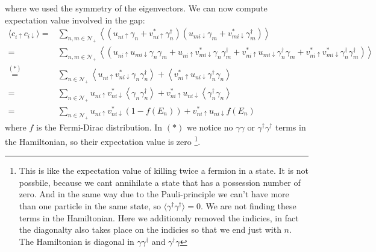 \documentclass[../main.tex]{subfile}
\begin{document}
where we used the symmetry of the eigenvectors. We can now compute expectation value involved in the gap:
\begin{equation}\label{eq:transfo_c_up_c_down_BdG}
\begin{aligned}
    \langle c_{i\uparrow}c_{i\downarrow} \rangle =& \sum_{n,m\in\mathcal{N}_+} \left\langle\left(u_{ni\uparrow}\gamma_n + v_{ni\uparrow}^{\ast}\gamma_{n}^{\dagger}\right)\left(u_{mi\downarrow}\gamma_m + v_{mi\downarrow}^{\ast}\gamma_{m}^{\dagger}\right)\right\rangle\\
     =&  \sum_{n,m\in\mathcal{N}_+} \left\langle\left(u_{ni\uparrow} u_{mi\downarrow}\gamma_n\gamma_m + u_{ni\uparrow} v_{mi\downarrow}^{\ast}\gamma_n\gamma_{m}^{\dagger} + v_{ni\uparrow}^{\ast}u_{mi\downarrow}\gamma_{n}^{\dagger} \gamma_m+  v_{ni\uparrow}^{\ast} v_{mi\downarrow}^{\ast}\gamma_{n}^{\dagger}\gamma_{m}^{\dagger}  \right)\right\rangle\\
     \stackrel{(\ast)}{=}&  \sum_{n\in\mathcal{N}_+} \left\langle u_{ni\uparrow} v_{ni\downarrow}^{\ast}\gamma_n\gamma_{n}^{\dagger}\right\rangle + \left\langle v_{ni\uparrow}^{\ast}u_{ni\downarrow}\gamma_{n}^{\dagger}\gamma_{n}\right\rangle\\     
     =&  \sum_{n\in\mathcal{N}_+} u_{ni\uparrow} v_{ni\downarrow}^{\ast}\left\langle\gamma_n\gamma_{n}^{\dagger}\right\rangle + v_{ni\uparrow}^{\ast}u_{ni\downarrow}\left\langle \gamma_{n}^{\dagger}\gamma_{n}\right\rangle\\
     =&  \sum_{n\in\mathcal{N}_+} u_{ni\uparrow} v_{ni\downarrow}^{\ast} \left(1-f(E_n)\right) + v_{ni\uparrow}^{\ast}u_{ni\downarrow}f(E_n)
\end{aligned}
\end{equation}
where $f$ is the Fermi-Dirac distribution. In $(\ast)$ we notice no $\gamma\gamma$ or $\gamma^{\dagger}\gamma^{\dagger}$ terms in the Hamiltonian, so their expectation 
value is zero
\footnote{This is like the expectation value of killing twice a fermion in a state. It is not possbile, because we cant annihilate a state that has a possession number of zero.
And in the same way due to the Pauli-principle we can't have more than one particle in the same state, so $\langle \gamma^{\dagger} \gamma^{\dagger} \rangle = 0$. We are not 
finding these terms in the Hamiltonian. Here we 
additionaly removed the indicies, in fact the diagonalty also takes place on the indicies so that we end just with $n$.
The Hamiltonian is diagonal in $\gamma\gamma^{\dagger}$ and $\gamma^{\dagger}\gamma$ }.
\end{document}
